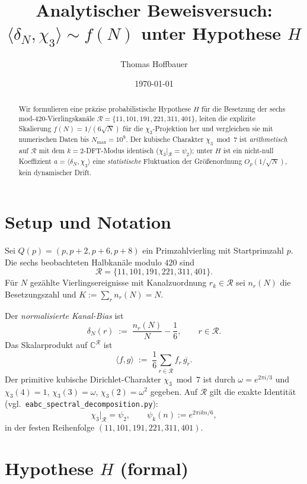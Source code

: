 \documentclass[11pt,a4paper]{article}
\title{Analytischer Beweisversuch:\\
$\langle\delta_N,\chi_3\rangle \sim f(N)$ unter Hypothese $H$}
\author{Thomas Hoffbauer}
\date{\today}
\newcommand{\R}{\mathcal{R}}
\begin{document}
\maketitle

\begin{abstract}
Wir formulieren eine präzise probabilistische Hypothese $H$ für die
Besetzung der sechs mod-$420$-Vierlingskanäle
$\R=\{11,101,191,221,311,401\}$,
leiten die explizite Skalierung
$f(N)=1/(6\sqrt{N})$ für die $\chi_3$-Projektion her und vergleichen sie
mit numerischen Daten bis $N_{\max}=10^9$.
Der kubische Charakter $\chi_3\bmod 7$ ist \emph{arithmetisch} auf
$\R$ mit dem $k{=}2$-DFT-Modus identisch ($\chi_3|_{\R}=\psi_2$);
unter $H$ ist ein nicht-null Koeffizient $a=\langle\delta_N,\chi_3\rangle$
eine \emph{statistische} Fluktuation der Größenordnung $O_p(1/\sqrt{N})$,
kein dynamischer Drift.
\end{abstract}

\section{Setup und Notation}

Sei $Q(p)=(p,p+2,p+6,p+8)$ ein Primzahlvierling mit Startprimzahl $p$.
Die sechs beobachteten Halbkanäle modulo $420$ sind
\[
  \R = \{11,101,191,221,311,401\}.
\]
Für $N$ gezählte Vierlingsereignisse mit Kanalzuordnung
$r_k\in\R$ sei $n_r(N)$ die Besetzungszahl und $K:=\sum_r n_r(N)=N$.

Der \emph{normalisierte Kanal-Bias} ist
\[
  \delta_N(r) \;:=\; \frac{n_r(N)}{N} - \frac{1}{6},
  \qquad r\in\R.
\]
Das Skalarprodukt auf $\mathbb{C}^{\R}$ ist
\[
  \langle f,g\rangle \;:=\; \frac{1}{6}\sum_{r\in\R} f_r\,\overline{g_r}.
\]
Der primitive kubische Dirichlet-Charakter $\chi_3\bmod 7$ ist durch
$\omega=e^{2\pi i/3}$ und
$\chi_3(4)=1$, $\chi_3(3)=\omega$, $\chi_3(2)=\omega^2$ gegeben.
Auf $\R$ gilt die exakte Identität (vgl.\ \texttt{eabc\_spectral\_decomposition.py}):
\[
  \chi_3|_{\R} = \psi_2,
  \qquad
  \psi_k(n) := e^{2\pi i kn/6},
\]
in der festen Reihenfolge $(11,101,191,221,311,401)$.

\section{Hypothese $H$ (formal)}
\end{document}
